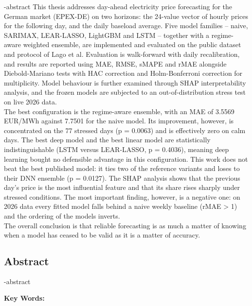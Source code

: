 
\en-abstract{
This thesis addresses day-ahead electricity price forecasting for the German
market (EPEX-DE) on two horizons: the 24-value vector of hourly prices for the
following day, and the daily baseload average. Five model families -- naive,
SARIMAX, LEAR-LASSO, LightGBM and LSTM -- together with a regime-aware weighted
ensemble, are implemented and evaluated on the public dataset and protocol of
Lago et al. Evaluation is walk-forward with daily recalibration, and results are
reported using MAE, RMSE, sMAPE and rMAE alongside Diebold-Mariano tests with HAC
correction and Holm-Bonferroni correction for multiplicity. Model behaviour is
further examined through SHAP interpretability analysis, and the frozen models
are subjected to an out-of-distribution stress test on live 2026 data.
\\[.35cm]
The best configuration is the regime-aware ensemble, with an MAE of 3.5569
EUR/MWh against 7.7501 for the naive model. Its improvement, however, is
concentrated on the 77 stressed days (p = 0.0063) and is effectively zero on
calm days. The best deep model and the best linear model are statistically
indistinguishable (LSTM versus LEAR-LASSO, p = 0.4036), meaning deep learning
bought no defensible advantage in this configuration. This work does not beat
the best published model: it ties two of the reference variants and loses to
their DNN ensemble (p = 0.0127). The SHAP analysis shows that the previous
day's price is the most influential feature and that its share rises sharply
under stressed conditions. The most important finding, however, is a negative
one: on 2026 data every fitted model falls behind a naive weekly baseline
(rMAE > 1) and the ordering of the models inverts.
\\[.35cm]
The overall conclusion is that reliable forecasting is as much a matter of
knowing when a model has ceased to be valid as it is a matter of accuracy.
}

\newpage
\thispagestyle{empty}
\begin{latin}
\section*{\LARGE\centering Abstract}

\een-abstract

\vspace*{.5cm}
{\large\textbf{Key Words:}}\par
\vspace*{.5cm}
\elatinkeywords
\end{latin}
